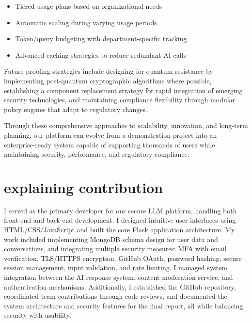 \documentclass{article}
\begin{document}
\begin{itemize}
    \item Tiered usage plans based on organizational needs
    \item Automatic scaling during varying usage periods
    \item Token/query budgeting with department-specific tracking
    \item Advanced caching strategies to reduce redundant AI calls
\end{itemize}

Future-proofing strategies include designing for quantum resistance by implementing post-quantum cryptographic algorithms where possible, establishing a component replacement strategy for rapid integration of emerging security technologies, and maintaining compliance flexibility through modular policy engines that adapt to regulatory changes.

Through these comprehensive approaches to scalability, innovation, and long-term planning, our platform can evolve from a demonstration project into an enterprise-ready system capable of supporting thousands of users while maintaining security, performance, and regulatory compliance.


\vfill\pagebreak




\section{explaining contribution}
I served as the primary developer for our secure LLM platform, handling both front-end and back-end development. I designed intuitive user interfaces using HTML/CSS/JavaScript and built the core Flask application architecture. My work included implementing MongoDB schema design for user data and conversations, and integrating multiple security measures: MFA with email verification, TLS/HTTPS encryption, GitHub OAuth, password hashing, secure session management, input validation, and rate limiting. 
I managed system integration between the AI response system, content moderation service, and authentication mechanisms. 
Additionally, I established the GitHub repository, coordinated team contributions through code reviews, and documented the system architecture and security features for the final report, all while balancing security with usability.
\end{document}
